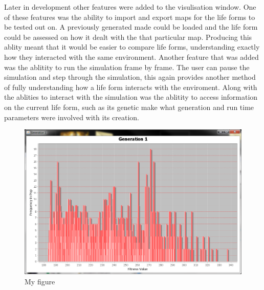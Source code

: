 \documentclass[10pt,twocolumn]{article}
\begin{document}
Later in development other features were added to the visulisation window. One of these features was the ability to import and export maps for the life forms to be
tested out on. A previously generated made could be loaded and the life form could be assessed on how it dealt with the that particular map. Producing this ablity meant that it would be easier to compare life forms, understanding exactly how they interacted with the same environment.
Another feature that was added was the ablitity to run the simulation frame by frame. The user can pause the simulation and step through the simulation, this again provides another method of fully understanding how a life form interacts with the enviroment. 
Along with the ablities to interact with the simulation was the ablitity to access information on the current life form, such as its genetic make what generation
and run time parameters were involved with its creation.



\begin{figure} [ht]
\centering
\includegraphics[scale = 0.25]{gen1-2500.png}
\caption{My figure}
\label{the-label-for-cross-referencing}
\end{figure}




\end{document}

